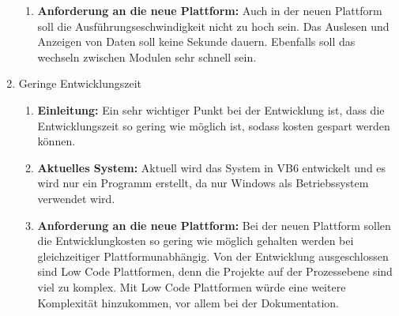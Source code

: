 \documentclass[ngerman]{article}
\begin{document}
\begin{enumerate}
\begin{enumerate}[label=]
            \item \textbf{Anforderung an die neue Plattform:} Auch in der neuen Plattform soll die Ausführungseschwindigkeit nicht zu hoch sein. Das Auslesen und Anzeigen von Daten soll keine Sekunde dauern. Ebenfalls soll das wechseln zwischen Modulen sehr schnell sein.\\
        \end{enumerate}
        \item Geringe Entwicklungszeit
        \begin{enumerate}[label=]
            \item \textbf{Einleitung:} Ein sehr wichtiger Punkt bei der Entwicklung ist, dass die Entwicklungszeit so gering wie möglich ist, sodass kosten gespart werden können.
            \item \textbf{Aktuelles System:} Aktuell wird das System in VB6 entwickelt und es wird nur ein Programm erstellt, da nur Windows als Betriebssystem verwendet wird.
            \item \textbf{Anforderung an die neue Plattform:} Bei der neuen Plattform sollen die Entwicklungkosten so gering wie möglich gehalten werden bei gleichzeitiger Plattformunabhängig. Von der Entwicklung ausgeschlossen sind Low Code Plattformen, denn die Projekte auf der Prozessebene sind viel zu komplex. Mit Low Code Plattformen würde eine weitere Komplexität hinzukommen, vor allem bei der Dokumentation.
        \end{enumerate}
    \end{enumerate}
\end{document}
